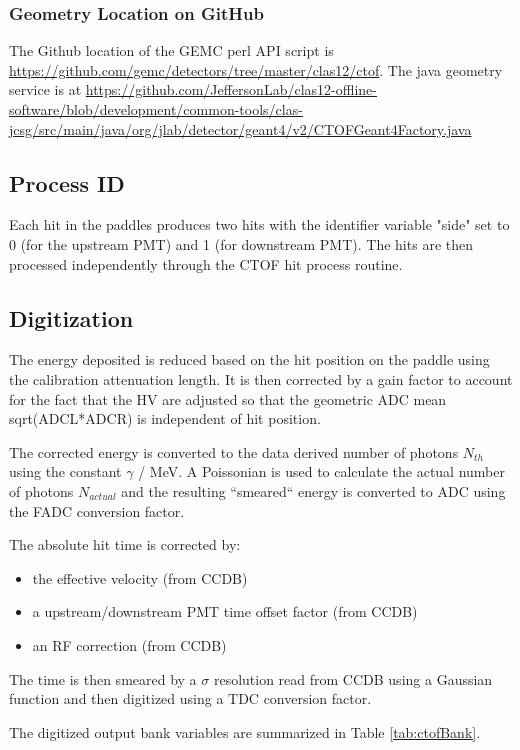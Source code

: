 \subsubsection{Geometry Location on GitHub}
The Github location of the GEMC perl API script is \url{https://github.com/gemc/detectors/tree/master/clas12/ctof}.
The java geometry service is at \url{https://github.com/JeffersonLab/clas12-offline-software/blob/development/common-tools/clas-jcsg/src/main/java/org/jlab/detector/geant4/v2/CTOFGeant4Factory.java}

\subsection{Process ID}

Each hit in the paddles produces two hits with the identifier variable "side" set to 0 (for the upstream PMT) and 1 (for downstream PMT).
The hits are then processed independently through the CTOF hit process routine.

\subsection{Digitization}


The energy deposited is reduced based on the hit position on the paddle using the calibration attenuation length. It is then corrected by a gain factor
to account for the fact that the HV are adjusted so that the geometric ADC mean sqrt(ADCL*ADCR) is independent of hit position.

The corrected energy is converted to the data derived number of photons $N_{th}$ using the constant $\gamma$ / MeV. A Poissonian is used to
calculate the actual number of photons $N_{actual}$ and the resulting ``smeared`` energy is converted to ADC using the FADC conversion factor.


The absolute hit time is corrected by:

\begin{itemize}
	\item the effective velocity (from CCDB)
	\item a upstream/downstream PMT time offset factor (from CCDB)
	\item an RF correction (from CCDB)
\end{itemize}

The time is then smeared by a $\sigma$ resolution read from CCDB using a Gaussian function and then digitized using a TDC conversion factor.

The digitized output bank variables are summarized in Table \ref{tab:ctofBank}.

